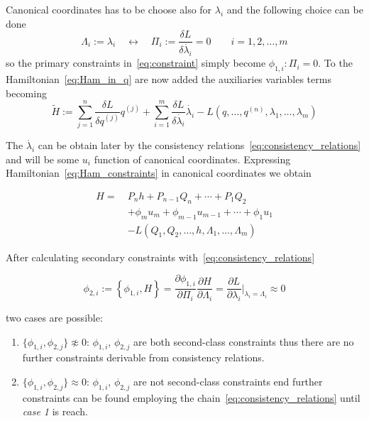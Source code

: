 Canonical coordinates has to be choose also for $\lambda_i$ and the following
choice can be done
\begin{equation} \label{eq:def_canonical_coordinates_lambda}
  \Lambda_{i}:= \lambda_{i}
  \quad \leftrightarrow \quad
  \Pi_{i} := \frac{\delta L}{\delta \dot{\lambda_{i}}} = 0
  \qquad i = 1, 2, \ldots, m
\end{equation}
so the primary constraints in~\eqref{eq:constraint} simply become
$\phi_{1, i}: \Pi_i = 0$. To the Hamiltonian~\eqref{eq:Ham_in_q} are now added
the auxiliaries variables terms becoming
\begin{equation} \label{eq:Ham_constraints_in_q}
  \tilde{H} :=
  \sum_{j=1}^{n} \frac{\delta L}{\delta q^{(j)}} q^{(j)} +
  \sum_{i=1}^{m} \frac{\delta L}{\delta \dot{\lambda_i}} \dot{\lambda_i} -
  L(q, \ldots, q^{(n)}, \lambda_1, \ldots, \lambda_m)
\end{equation}

The $\dot{\lambda_i}$ can be obtain later by the consistency
relations~\eqref{eq:consistency_relations} and will be some $u_i$ function of
canonical coordinates. Expressing Hamiltonian~\eqref{eq:Ham_constraints} in
canonical coordinates we obtain

\begin{align} \label{eq:Ham_constraints}
  H =\ & P_n h + P_{n-1} Q_n + \cdots + P_1 Q_2 \nonumber \\
       & + \phi_m u_m + \phi_{m-1} u_{m-1} + \cdots + \phi_1 u_1 \nonumber \\
       & - L ( Q_1, Q_2, \ldots, h, \Lambda_1, \ldots, \Lambda_m)
\end{align}


After calculating secondary constraints with~\eqref{eq:consistency_relations}

\begin{equation*}
  \phi_{2, i} := \left\{ \phi_{1,i}, H \right\} =
  \frac{\partial \phi_{1,i}}{\partial \Pi_i}
  \frac{\partial H}{\partial \Lambda_i} =
  \frac{\partial L}{\partial \lambda_i} \Big|_{\lambda_i = \Lambda_i}
  \approx 0
\end{equation*}

two cases are possible:

\begin{enumerate}
  \item $\{\phi_{1,i}, \phi_{2,j}\} \not\approx 0$: $\phi_{1,i}$, $\phi_{2,j}$ are
    both second-class constraints thus there are no further constraints
    derivable from consistency relations.
  \item $\{\phi_{1,i}, \phi_{2,j}\} \approx 0$: $\phi_{1,i}$, $\phi_{2,j}$ are
    not second-class constraints end further constraints can be found employing
    the chain~\eqref{eq:consistency_relations} until \emph{case 1} is reach.
\end{enumerate}

